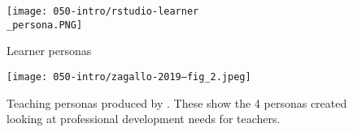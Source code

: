 \documentclass[010-intro.tex]{subfiles}
\begin{document}
    \begin{figure}[htb]
        \centering
        \texttt{[image: 050-intro/rstudio-learner\\\_persona.PNG]}
        \caption[RStudio Learner Personas]{
        Learner personas}
        \label{fig:rstudio-learner-personas}
    \end{figure}

    \begin{figure}[htb]
        \centering
        \texttt{[image: 050-intro/zagallo-2019--fig\_2.jpeg]}
        \caption[Teaching Personas Reproduced from \citet{zagallo2019through}]{
        Teaching personas produced by \citet{zagallo2019through}.
        These show the 4 personas created looking at professional development needs for teachers.
        }
        \label{fig:teaching-personas}
    \end{figure}
\end{document}
